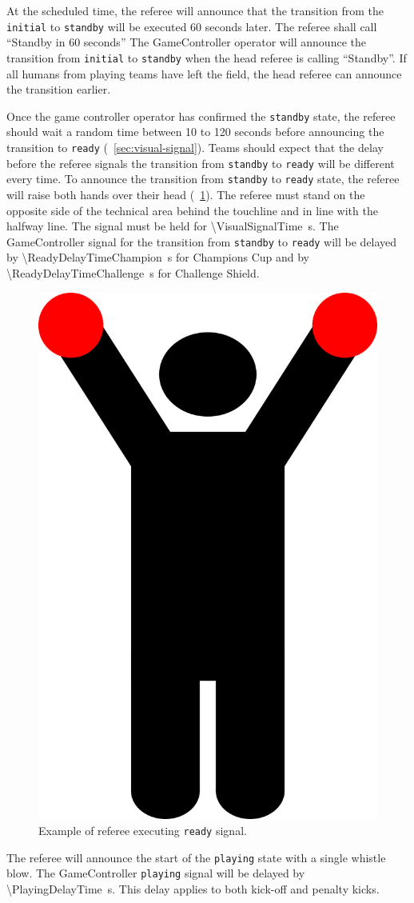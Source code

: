 At the scheduled time, the referee will announce that the transition from the \texttt{initial} to \texttt{standby} will be executed 60 seconds later.
The referee shall call ``Standby in 60 seconds''
The GameController operator will announce the transition from \texttt{initial} to \texttt{standby} when the head referee is calling ``Standby''.
If all humans from playing teams have left the field, the head referee can announce the transition earlier.


Once the game controller operator has confirmed the \texttt{standby} state, the referee should wait a random time between 10 to 120 seconds before announcing the transition to \texttt{ready} (\cf~\cref{sec:visual-signal}).
Teams should expect that the delay before the referee signals the transition from \texttt{standby} to \texttt{ready} will be different every time.
To announce the transition from \texttt{standby} to \texttt{ready} state, the referee will raise both hands over their head (\cf~\cref{fig:ready-signal}).
The referee must stand on the opposite side of the technical area behind the touchline and in line with the halfway line.
The signal must be held for \qty{\VisualSignalTime}{\second}.
The GameController signal for the transition from \texttt{standby} to \texttt{ready} will be delayed by \qty{\ReadyDelayTimeChampion}{\second} for Champions Cup and by \qty{\ReadyDelayTimeChallenge}{\second} for Challenge Shield.

\begin{figure}
  \centerline{
      \includegraphics[height=0.35\columnwidth]{figs/visual-signal/Ready.png}
  }
  \caption{Example of referee executing \texttt{ready} signal.}
  \label{fig:ready-signal}
\end{figure}

The referee will announce the start of the \texttt{playing} state with a single whistle blow.
The GameController \texttt{playing} signal will be delayed by \qty{\PlayingDelayTime}{\second}.
This delay applies to both kick-off and penalty kicks.

